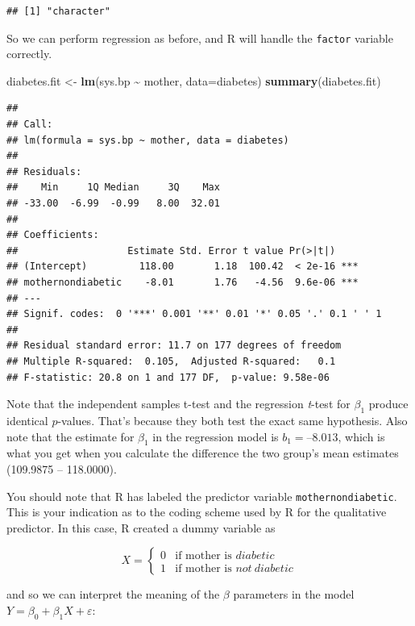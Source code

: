 \documentclass[
]{book}
\newenvironment{Shaded}{\begin{snugshade}}{\end{snugshade}}
\newcommand{\AttributeTok}[1]{\textcolor[rgb]{0.13,0.29,0.53}{#1}}
\newcommand{\FunctionTok}[1]{\textcolor[rgb]{0.13,0.29,0.53}{\textbf{#1}}}
\newcommand{\NormalTok}[1]{#1}
\newcommand{\OtherTok}[1]{\textcolor[rgb]{0.56,0.35,0.01}{#1}}
\newcommand{\SpecialCharTok}[1]{\textcolor[rgb]{0.81,0.36,0.00}{\textbf{#1}}}
\begin{document}
\begin{verbatim}
## [1] "character"
\end{verbatim}

So we can perform regression as before, and R will handle the \texttt{factor} variable correctly.

\begin{Shaded}
\begin{Highlighting}[]
\NormalTok{diabetes.fit }\OtherTok{\textless{}{-}} \FunctionTok{lm}\NormalTok{(sys.bp }\SpecialCharTok{\textasciitilde{}}\NormalTok{ mother, }\AttributeTok{data=}\NormalTok{diabetes)}
\FunctionTok{summary}\NormalTok{(diabetes.fit)}
\end{Highlighting}
\end{Shaded}

\begin{verbatim}
## 
## Call:
## lm(formula = sys.bp ~ mother, data = diabetes)
## 
## Residuals:
##    Min     1Q Median     3Q    Max 
## -33.00  -6.99  -0.99   8.00  32.01 
## 
## Coefficients:
##                   Estimate Std. Error t value Pr(>|t|)    
## (Intercept)         118.00       1.18  100.42  < 2e-16 ***
## mothernondiabetic    -8.01       1.76   -4.56  9.6e-06 ***
## ---
## Signif. codes:  0 '***' 0.001 '**' 0.01 '*' 0.05 '.' 0.1 ' ' 1
## 
## Residual standard error: 11.7 on 177 degrees of freedom
## Multiple R-squared:  0.105,  Adjusted R-squared:   0.1 
## F-statistic: 20.8 on 1 and 177 DF,  p-value: 9.58e-06
\end{verbatim}

Note that the independent samples t-test and the regression \emph{t}-test for \(\beta_1\) produce identical \(p\)-values. That's because they both test the exact same hypothesis. Also note that the estimate for \(\beta_{1}\) in the regression model is \(b_1 = –8.013\), which is what you get when you calculate the difference the two group's mean estimates (109.9875 -- 118.0000).

You should note that R has labeled the predictor variable \texttt{mothernondiabetic}. This is your indication as to the coding scheme used by R for the qualitative predictor. In this case, R created a dummy variable as

\[X = \left\{\begin{array}{ll} 0 & \textrm{if mother is } diabetic \\ 1 & \textrm{if mother is } not~diabetic\end{array}\right.\]

and so we can interpret the meaning of the \(\beta\) parameters in the model \(Y = \beta_0 + \beta_1 X + \varepsilon\):
\end{document}
